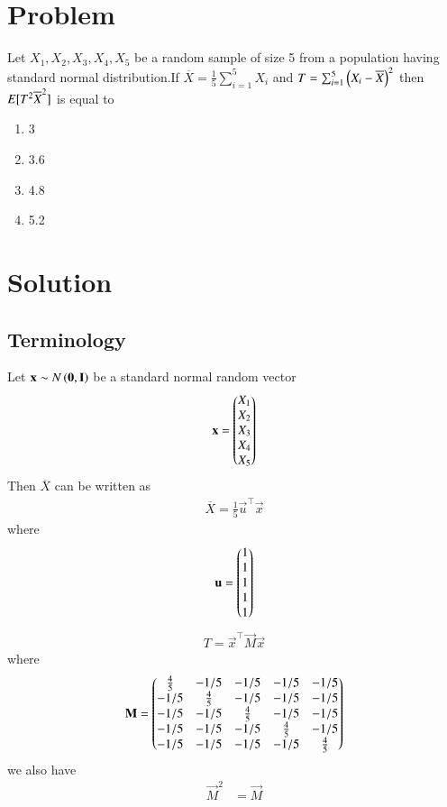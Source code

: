 \documentclass[journal,12pt,twocolumn]{IEEEtran}
\begin{document}
\section{Problem}
Let $X_1,X_2,X_3,X_4,X_5$ be a random sample of size 5 from a population having standard normal distribution.If 
$\overline{X}=\frac{1}{5}\sum_{i=1}^5 X_i$ and $T=\sum_{i=1}^5\left(X_i-\overline{X}\right)^2$
then $E[ T^2\overline{X}^2 ]$ is equal to 
\begin{enumerate}
    \item 3
    \item 3.6
    \item 4.8
    \item 5.2
\end{enumerate}
\section{Solution}
\subsection{Terminology}
Let $\mathbf{x} \sim N\left(\mathbf{0},\mathbf{I}\right)$ be a standard normal random vector 
\begin{align}
    \mathbf{x}=\begin{pmatrix}X_1\\
             X_2\\
             X_3\\
             X_4\\
             X_5\end{pmatrix}
\end{align}
Then $\overline{X}$ can be written as
\begin{align}
    \overline{X}=\frac{1}{5}\vec{u}^{\top}\vec{x}
\end{align}
where 
\begin{align}
    \mathbf{u}=\begin{pmatrix}1\\
                      1\\
                      1\\
                      1\\
                      1\end{pmatrix}
\end{align} 
\begin{align}
   T=\vec{x}^{\top}\vec{M}\vec{x}
\end{align}
where
\begin{align}
    \mathbf{M}&=\begin{pmatrix}\frac{4}{5}&-1/5&-1/5&-1/5&-1/5\\
                   -1/5&\frac{4}{5}&-1/5&-1/5&-1/5\\
                   -1/5&-1/5&\frac{4}{5}&-1/5&-1/5\\
                   -1/5&-1/5&-1/5&\frac{4}{5}&-1/5\\
                   -1/5&-1/5&-1/5&-1/5&\frac{4}{5}\end{pmatrix}\\
\end{align}
we also have 
\begin{align}
    \vec{M}^2&=\vec{M}
\end{align}
\end{document}
